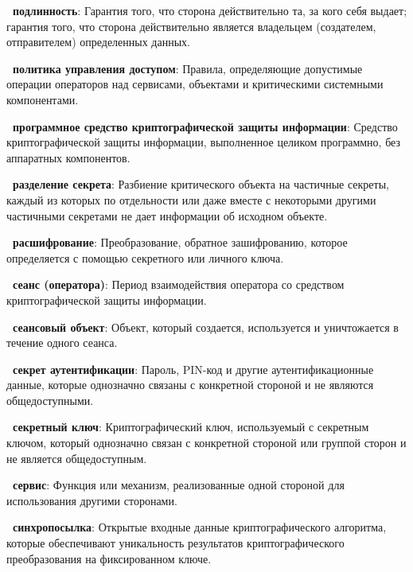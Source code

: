 {\bf \thedefctr~подлинность}:
Гарантия того, что сторона действительно та, за кого себя выдает; гарантия того,
что сторона действительно является владельцем (создателем, отправителем)
определенных данных.

{\bf \thedefctr~политика управления доступом}:
Правила, определяющие допустимые операции операторов над сервисами, объектами и
критическими системными компонентами.

{\bf \thedefctr~программное средство криптографической защиты информации}:
Средство криптографической защиты информации, выполненное целиком программно, 
без аппаратных компонентов. 

{\bf \thedefctr~разделение секрета}:
Разбиение критического объекта на частичные секреты, 
каждый из которых по отдельности или даже вместе с некоторыми
другими частичными секретами не дает информации об исходном объекте.

{\bf \thedefctr~расшифрование}:
Преобразование, обратное зашифрованию, которое определяется с помощью
секретного или личного ключа.

{\bf \thedefctr~сеанс (оператора)}:
Период взаимодействия оператора со средством криптографической
защиты информации.

{\bf \thedefctr~сеансовый объект}:
Объект, который создается, 
используется и уничтожается в течение одного сеанса.

{\bf \thedefctr~секрет аутентификации}:
Пароль, PIN-код и другие аутентификационные данные, которые однозначно связаны с
конкретной стороной и не являются общедоступными.

{\bf \thedefctr~секретный ключ}:
Криптографический ключ, используемый  
с секретным ключом, который однозначно связан с конкретной стороной или группой
сторон и не является общедоступным.


{\bf \thedefctr~сервис}:
Функция или механизм, реализованные одной стороной для использования другими 
сторонами.

%

{\bf \thedefctr~синхропосылка}:
Открытые входные данные криптографического алгоритма,
которые обеспечивают уникальность результатов 
криптографического преобразования на фиксированном ключе.

